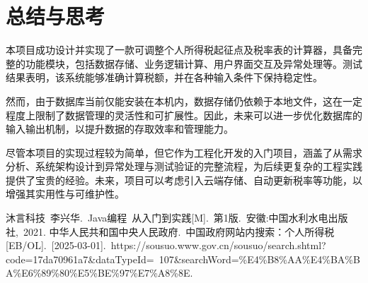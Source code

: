 \documentclass[a4paper, utf8]{ctexart}
\begin{document}
    \section{总结与思考}

    本项目成功设计并实现了一款可调整个人所得税起征点及税率表的计算器，具备完整的功能模块，包括数据存储、业务逻辑计算、用户界面交互及异常处理等。测试结果表明，该系统能够准确计算税额，并在各种输入条件下保持稳定性。

    然而，由于数据库当前仅能安装在本机内，数据存储仍依赖于本地文件，这在一定程度上限制了数据管理的灵活性和可扩展性。因此，未来可以进一步优化数据库的输入输出机制，以提升数据的存取效率和管理能力。

    尽管本项目的实现过程较为简单，但它作为工程化开发的入门项目，涵盖了从需求分析、系统架构设计到异常处理与测试验证的完整流程，为后续更复杂的工程实践提供了宝贵的经验。未来，项目可以考虑引入云端存储、自动更新税率等功能，以增强其实用性与可维护性。
    
    \let\cleardoublepage\clearpage
    
    \begin{thebibliography}{99}
         沐言科技\ 李兴华.\ Java编程\ 从入门到实践[M].\ 第1版.\ 安徽:中国水利水电出版社,\ 2021.
         中华人民共和国中央人民政府.\ 中国政府网站内搜索：个人所得税[EB/OL].\ [2025-03-01].\ https://sousuo.www.gov.cn/sousuo/search.shtml?code=17da70961a7\&dataTypeId=\ 107\&searchWord=\%E4\%B8\%AA\%E4\%BA\%BA\%E6\%89\%80\%E5\%BE\%97\%E7\%A8\%8E.
    \end{thebibliography}
\end{document}
